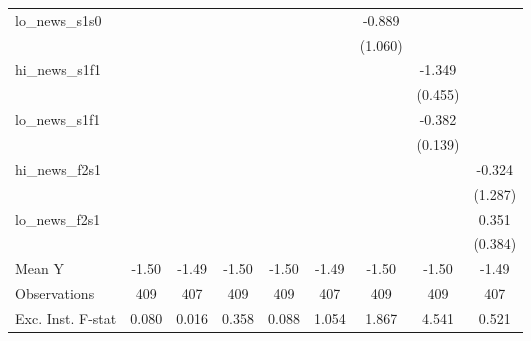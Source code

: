 {\begin{tabular}{l*{8}{c}}
\addlinespace
lo\_news\_s1s0&                     &                     &                     &                     &                     &      -0.889         &                     &                     \\
            &                     &                     &                     &                     &                     &     (1.060)         &                     &                     \\
\addlinespace
hi\_news\_s1f1&                     &                     &                     &                     &                     &                     &      -1.349\sym{***}&                     \\
            &                     &                     &                     &                     &                     &                     &     (0.455)         &                     \\
\addlinespace
lo\_news\_s1f1&                     &                     &                     &                     &                     &                     &      -0.382\sym{***}&                     \\
            &                     &                     &                     &                     &                     &                     &     (0.139)         &                     \\
\addlinespace
hi\_news\_f2s1&                     &                     &                     &                     &                     &                     &                     &      -0.324         \\
            &                     &                     &                     &                     &                     &                     &                     &     (1.287)         \\
\addlinespace
lo\_news\_f2s1&                     &                     &                     &                     &                     &                     &                     &       0.351         \\
            &                     &                     &                     &                     &                     &                     &                     &     (0.384)         \\
\midrule
Mean Y      &       -1.50         &       -1.49         &       -1.50         &       -1.50         &       -1.49         &       -1.50         &       -1.50         &       -1.49         \\
Observations&         409         &         407         &         409         &         409         &         407         &         409         &         409         &         407         \\
Exc. Inst. F-stat&       0.080         &       0.016         &       0.358         &       0.088         &       1.054         &       1.867         &       4.541         &       0.521         \\
\bottomrule
\end{tabular}
}
